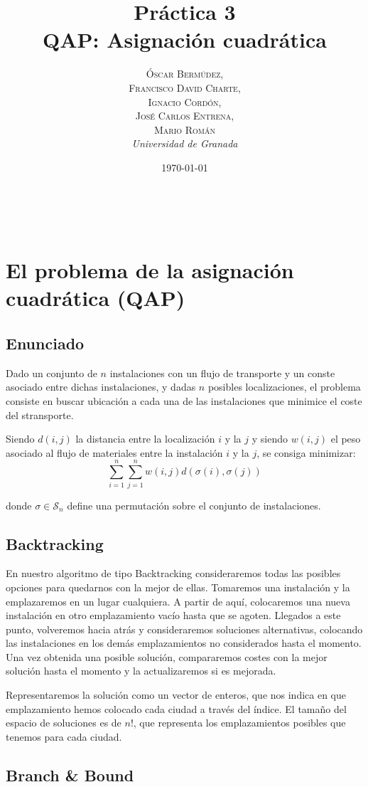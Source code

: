 \documentclass[a4paper, 11pt]{article} %
\title{\textbf{Práctica 3}\\ %
QAP: Asignación cuadrática} %
\author{\textsc{Óscar Bermúdez,\\Francisco David Charte,\\Ignacio Cordón,\\José Carlos Entrena,\\Mario Román} %
\\{\textit{Universidad de Granada}}} %
\date{\today} %
\makeatletter
\renewcommand{\maketitle}{ %
\begin{flushright} %
{\LARGE\@title} %

\vspace{50pt} %

{\large\@author} %
\\\@date %

\vspace{40pt} %
\end{flushright}
}
\makeatother
\begin{document}
\maketitle %

\renewcommand{\abstractname}{Resumen} %
\begin{abstract}
\end{abstract}
{\parskip=2pt
\tableofcontents
}
\pagebreak

\section{El problema de la asignación cuadrática (QAP)}
      \subsection{Enunciado}
	Dado un conjunto de $n$ instalaciones con un flujo de transporte y
	un conste asociado entre dichas instalaciones, y dadas $n$ posibles localizaciones,
	el problema consiste en buscar ubicación a cada una de las instalaciones que
	minimice el coste del stransporte.
	
	Siendo $d(i,j)$ la distancia entre la localización $i$ y la $j$
	y siendo $w(i,j)$ el peso asociado al flujo de materiales entre la instalación
	$i$ y la $j$, se consiga minimizar:
	\begin{equation}
	\sum_{i=1}^n \sum_{j=1}^nw(i,j) d(\sigma(i),\sigma(j))
	\label{coste}
	\end{equation}

	donde $\sigma \in \mathcal{S}_n$ define una permutación sobre el conjunto de instalaciones.

    
      \subsection{Backtracking}
	En nuestro algoritmo de tipo Backtracking consideraremos todas las posibles opciones para quedarnos con la mejor de ellas.
	Tomaremos una instalación y la emplazaremos en un lugar cualquiera. A partir de aquí, colocaremos una nueva instalación
	en otro emplazamiento vacío hasta que se agoten. Llegados a este punto, volveremos hacia atrás y consideraremos soluciones
	alternativas, colocando las instalaciones en los demás emplazamientos no considerados hasta el momento. Una vez obtenida una
	posible solución, compararemos costes con la mejor solución hasta el momento y la actualizaremos si es mejorada.       
	
	Representaremos la solución como un vector de enteros, que nos indica en que emplazamiento hemos colocado cada ciudad a 
	través del índice. El tamaño del espacio de soluciones es de $n!$, que representa los emplazamientos posibles que tenemos 
	para cada ciudad. 
      
      \subsection{Branch \& Bound}
	
\end{document}
